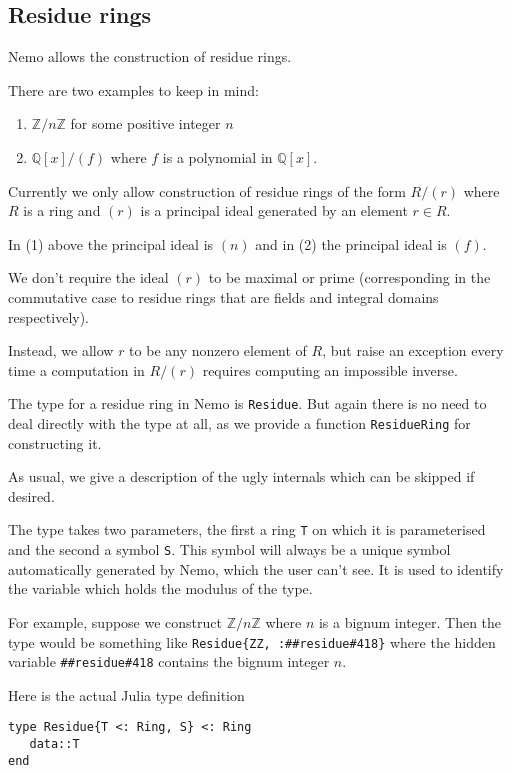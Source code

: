 \documentclass[a4paper,10pt]{article}
\newcommand{\Z}{\mathbb{Z}}
\newcommand{\Q}{\mathbb{Q}}
\newcommand{\code}{\lstinline}
\begin{document}
{{\subsection{Residue rings}

Nemo allows the construction of residue rings. 

There are two examples to keep in mind:

\begin{enumerate}
\item $\Z/n\Z$ for some positive integer $n$

\item $\Q[x]/(f)$ where $f$ is a polynomial in $\Q[x]$.
\end{enumerate}

Currently we only allow construction of residue rings of the form $R/(r)$ where
$R$ is a ring and $(r)$ is a principal ideal generated by an element $r \in R$. 

In (1) above the principal ideal is $(n)$ and in (2) the principal
ideal is $(f)$.

We don't require the ideal $(r)$ to be maximal or prime (corresponding in the
commutative case to residue rings that are fields and integral domains 
respectively). 

Instead, we allow $r$ to be any nonzero element of $R$, but raise an exception
every time a computation in $R/(r)$ requires computing an impossible inverse.

The type for a residue ring in Nemo is \code{Residue}. But again there is no
need to deal directly with the type at all, as we provide a function
\code{ResidueRing} for constructing it.

As usual, we give a description of the ugly internals which can be skipped if
desired.

The type takes two parameters, the first a ring \code{T} on which it is
parameterised and the second a symbol \code{S}. This symbol will always be
a unique symbol automatically generated by Nemo, which the user can't see. It
is used to identify the variable which holds the modulus of the type.

For example, suppose we construct $\Z/n\Z$ where $n$ is a bignum integer. Then
the type would be something like \code|Residue{ZZ, :##residue#418}| where the
hidden variable \code{##residue#418} contains the bignum integer $n$.

Here is the actual Julia type definition

\begin{lstlisting}
type Residue{T <: Ring, S} <: Ring
   data::T
end
\end{lstlisting}

}}
\end{document}
